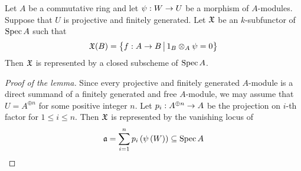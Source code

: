 \begin{lemma}\label{lemma:representability_of_vanishing_locus}
Let $A$ be a commutative ring and let $\psi:W\rightarrow U$ be a morphism of $A$-modules. Suppose that $U$ is projective and finitely generated. Let ${\mathfrak X}$ be an $k$-subfunctor of $\mathrm{Spec}\, A$ such that
$${\mathfrak X}(B) = \big\{f:A\rightarrow B\,\big|\,1_B\otimes_A\psi = 0\big\}$$
Then ${\mathfrak X}$ is represented by a closed subscheme of $\mathrm{Spec}\, A$.
\end{lemma}
\begin{proof}[Proof of the lemma]
Since every projective and finitely generated $A$-module is a direct summand of a finitely generated and free $A$-module, we may assume that $U = A^{\oplus n}$ for some positive integer $n$. Let $p_i:A^{\oplus n}\rightarrow A$ be the projection on $i$-th factor for $1\leq i\leq n$. Then ${\mathfrak X}$ is represented by the vanishing locus of
$$\mathfrak{a} = \sum_{i=1}^n p_i\left(\psi\left(W\right)\right) \subseteq \mathrm{Spec}\, A$$
\end{proof}

